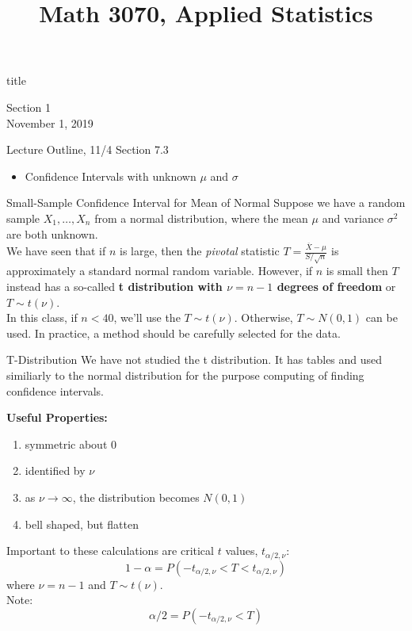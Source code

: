 \documentclass[t,handout]{beamer}
\title{Math 3070, Applied Statistics}
\newcommand{\nl}[1]{\vspace{#1 em}}
\begin{document}
\begin{frame}[c]
    \begin{beamercolorbox}[rounded=true,wd=\textwidth,center]{title}
        \inserttitle
    \end{beamercolorbox}
    \begin{center}
        Section 1\\
        \nl{0.5}
        November 1, 2019
    \end{center}
\end{frame}
\begin{frame}[c]{Lecture Outline, 11/4}
    Section 7.3
    \begin{itemize}
        \item Confidence Intervals with unknown $\mu$ and $\sigma$
    \end{itemize}
\end{frame}
\begin{frame}{Small-Sample Confidence Interval for Mean of Normal}
    Suppose we have a random sample $X_1,\dots,X_n$ from a normal distribution, where the mean $\mu$ and variance $\sigma^2$ are both unknown. 
    \\
    \nl{0.5}
    We have seen that if $n$ is large, then the \emph{pivotal} statistic $T=\frac{\overline{X}-\mu}{S/\sqrt{n}}$ is approximately a standard normal random variable. However, if $n$ is small then $T$ instead has a so-called {\bf t distribution with $\nu=n-1$ degrees of freedom} or $T\sim t(\nu)$.
    \\
    \nl{0.5}
    In this class, if $n<40$, we'll use the $T\sim t(\nu)$. Otherwise, $T\sim N(0,1)$ can be used. In practice, a method should be carefully selected for the data.
\end{frame}
\begin{frame}{T-Distribution}
    We have not studied the t distribution. It has tables and used similiarly to the normal distribution for the purpose computing of finding confidence intervals. 
    
    {\bf Useful Properties:}
    \begin{enumerate}
        \item symmetric about $0$
        \item identified by $\nu$
        \item as $\nu \to \infty$, the distribution becomes $N(0,1)$
        \item bell shaped, but flatten
    \end{enumerate}
    Important to these calculations are critical $t$ values, $t_{\alpha/2,\nu}$:
    $$1-\alpha = P(-t_{\alpha/2,\nu}< T < t_{\alpha/2,\nu})$$
    where $\nu = n-1$ and $T\sim t(\nu)$.\\
    Note:
    $$ \alpha/2 = P(-t_{\alpha/2,\nu}< T) $$
    \end{frame}
\end{document}
